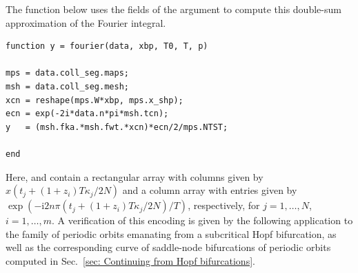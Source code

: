 The function  below uses the fields of the  argument to compute this double-sum approximation of the Fourier integral.
\begin{lstlisting}[language=coco-highlight,frame=shadowbox]
function y = fourier(data, xbp, T0, T, p)

mps = data.coll_seg.maps;
msh = data.coll_seg.mesh;
xcn = reshape(mps.W*xbp, mps.x_shp);
ecn = exp(-2i*data.n*pi*msh.tcn);
y   = (msh.fka.*msh.fwt.*xcn)*ecn/2/mps.NTST;

end
\end{lstlisting}
Here,  and  contain a rectangular array with columns given by $x(t_j+(1+z_i)T\kappa_j/2N)$ and a column array  with entries given by $\exp{\left(-\mathrm{i}2n\pi (t_j+(1+z_i)T\kappa_j/2N)/T\right)}$, respectively, for $j=1,\ldots,N$, $i=1,\ldots,m$. A verification of this encoding is given by the following application to the family of periodic orbits emanating from a subcritical Hopf bifurcation, as well as the corresponding curve of saddle-node bifurcations of periodic orbits computed in Sec.~\ref{sec: Continuing from Hopf bifurcations}.
